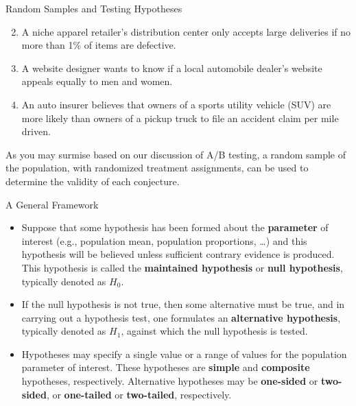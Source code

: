 \documentclass[pdf]{beamer}
\newcommand{\empr}[1]{{\color{franklinblue}\textbf{#1}}}
\theoremstyle{remark}
\theoremstyle{definition}
\begin{document}
\begin{frame}[t]{Random Samples and Testing Hypotheses}
\begin{enumerate}
    \setcounter{enumi}{1} 
    \item A niche apparel retailer's distribution center only accepts large deliveries if no more than 1\% of items are defective.
    \item A website designer wants to know if a local automobile dealer's website appeals equally to men and women. 
    \item An auto insurer believes that owners of a sports utility vehicle (SUV) are more likely than owners of a pickup truck to file an accident claim per mile driven.
\end{enumerate}
\vspace{1.2ex}
As you may surmise based on our discussion of A/B testing, a random sample of the population, with randomized treatment assignments, can be used to determine the validity of each conjecture.
\end{frame}

\begin{frame}[t]{A General Framework}
\small
\begin{itemize}
\item Suppose that some hypothesis has been formed about the \empr{parameter} of interest (e.g., population mean, population proportions, \ldots) and this hypothesis will be believed unless sufficient contrary evidence is produced.  This hypothesis is called the \empr{maintained hypothesis} or \empr{null hypothesis}, typically denoted as $H_0$.
\item If the null hypothesis is not true, then some alternative must be true, and in carrying out a hypothesis test, one formulates an \empr{alternative hypothesis}, typically denoted as $H_1$, against which the null hypothesis is tested.  
\item Hypotheses may specify a single value or a range of values for the population parameter of interest.  These hypotheses are \empr{simple} and \empr{composite} hypotheses, respectively.  Alternative hypotheses may be \empr{one-sided} or \empr{two-sided}, or \empr{one-tailed} or \empr{two-tailed}, respectively.  
\end{itemize}
\end{frame}
\end{document}
